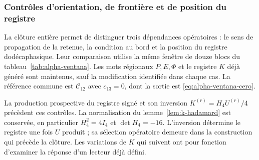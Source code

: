\subsubsection{Contrôles d'orientation, de frontière et de position du registre}
\label{mg05:controles}

La clôture entière permet de distinguer trois dépendances opératoires :
le sens de propagation de la retenue, la condition au bord et la position du
registre dodécaphasique. Leur comparaison utilise la même fenêtre de douze
blocs du tableau~\ref{tab:alpha-ventana}. Les mots
régionaux \(P,E,\Phi\) et le registre \(K\) déjà généré sont maintenus, sauf la
modification identifiée dans chaque cas. La référence commune est
\(\mathcal C_{12}\) avec \(c_{13}=0\), dont la sortie est
\eqref{eq:alpha-ventana-cero}.

La production prospective du registre signé et son inversion \(K^{(r)}=H_4U^{(r)}/4\) précèdent ces contrôles. La normalisation du lemme~\ref{lem:k-hadamard} est conservée, en particulier \(H_4^2=4I_4\) et \(\det H_4=-16\). L'inversion détermine le registre une fois \(U\) produit ; sa sélection opératoire demeure dans la construction qui précède la clôture. Les variations de \(K\) qui suivent ont pour fonction d'examiner la réponse d'un lecteur déjà défini.

